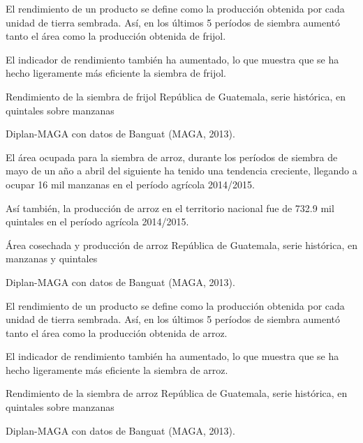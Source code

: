 
%
{%
El rendimiento de un producto se define como la producción obtenida por cada unidad de tierra sembrada. Así, en los últimos 5 períodos de siembra aumentó tanto el área como la producción obtenida de frijol.

El indicador de rendimiento también ha aumentado, lo que muestra que se ha hecho ligeramente más eficiente la siembra de frijol. 
}%
{%
	Rendimiento de la siembra de frijol} %
{%
	República de Guatemala, serie histórica, en quintales sobre manzanas } %
{%
	\begin{tikzpicture}[x=1pt,y=1pt]    \end{tikzpicture}}%
{%
	Diplan-MAGA con datos de Banguat (MAGA, 2013).} %


%
{%
El área ocupada para la siembra de arroz, durante los períodos de siembra de mayo de un año a abril del siguiente ha tenido una tendencia creciente, llegando a ocupar 16 mil  manzanas en el período agrícola 2014/2015.

Así también, la producción de arroz en el territorio nacional fue de 732.9 mil quintales en el período agrícola 2014/2015.
}%
{%
	Área cosechada y producción de arroz} %
{%
	República de Guatemala, serie histórica, en manzanas y  quintales } %
{%
	\begin{tikzpicture}[x=1pt,y=1pt]    \end{tikzpicture}}%
{%
	Diplan-MAGA con datos de Banguat (MAGA, 2013).} %



%
{%
El rendimiento de un producto se define como la producción obtenida por cada unidad de tierra sembrada. Así, en los últimos 5 períodos de siembra aumentó tanto el área como la producción obtenida de arroz.

El indicador de rendimiento también ha aumentado, lo que muestra que se ha hecho ligeramente más eficiente la siembra de arroz. 
}%
{%
	Rendimiento de la siembra de arroz} %
{%
	República de Guatemala, serie histórica, en quintales sobre manzanas } %
{%
	\begin{tikzpicture}[x=1pt,y=1pt]    \end{tikzpicture}}%
{%
	Diplan-MAGA con datos de Banguat (MAGA, 2013).} %

